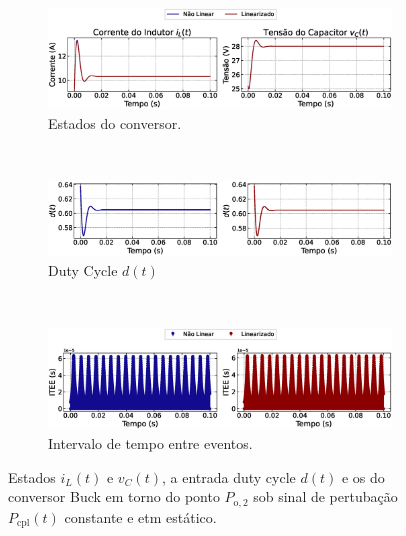\begin{figure}[H]
  \centering
  \captionsetup{justification=centering}
  \begin{subfigure}{1.\textwidth}
    \centering
    \includegraphics[width=1.\textwidth]{figuras/static-etm/buck/sim1/op2/result.eps}
    \caption{Estados do conversor.}
    \label{fig:buck_converter_constant_pcpl_static_etm_op2_duty_a}
  \end{subfigure}
  \\[6pt]
  \begin{subfigure}{1.\textwidth}
    \centering
    \includegraphics[width=1.\textwidth]{figuras/static-etm/buck/sim1/op2/duty-cycle.eps}
    \caption{Duty Cycle $d(t)$}
    \label{fig:buck_converter_constant_pcpl_static_etm_op2_duty_b}
  \end{subfigure}
  \\[6pt]
  \begin{subfigure}{1.\textwidth}
    \centering
    \includegraphics[width=1.\textwidth]{figuras/static-etm/buck/sim1/op2/inter-event-times.eps}
    \caption{Intervalo de tempo entre eventos.}
    \label{fig:buck_converter_constant_pcpl_static_etm_op2_duty_c}
  \end{subfigure}
  \caption{Estados $i_L(t)$ e $v_C(t)$, a entrada duty cycle $d(t)$ e os  do conversor Buck em torno do ponto $P_{\mathrm{o}, 2}$ sob sinal de pertubação $P_{\mathrm{cpl}}(t)$ constante e \acrshort{etm} estático.}
\end{figure}


